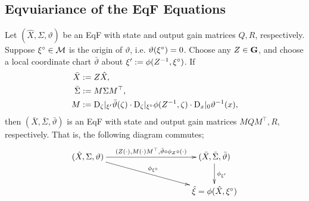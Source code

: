 \documentclass{article}
\begin{document}
\subsection{Eqvuiariance of the EqF Equations}

\begin{theorem} \label{theorem:origin_change}
Let $(\hat{X}, \Sigma, \vartheta)$ be an EqF with state and output gain matrices $Q,R$, respectively.
Suppose ${\xi}^\circ \in \mathcal{M}$ is the origin of $\vartheta$, i.e. $\vartheta({\xi}^\circ) = 0$.
Choose any $Z \in \mathbf{G}$, and choose a local coordinate chart $\bar{\vartheta}$ about $\xi' := \phi(Z^{-1}, {\xi}^\circ)$.
If 
\begin{align}
    \bar{X} &:= Z \hat{X}, \\
    \bar{\Sigma} &:= M \Sigma M^\top, \\
    M &:= \mathrm{D}_\zeta |_{\xi'} \bar{\vartheta}(\zeta) \cdot \mathrm{D}_\zeta |_{{\xi}^\circ} \phi(Z^{-1}, \zeta) \cdot \mathrm{D}_x|_0 \vartheta^{-1}(x),
\end{align}
then $(\bar{X}, \bar{\Sigma}, \bar{\vartheta})$ is an EqF with state and output gain matrices $M Q M^\top, R$, respectively.
That is, the following diagram commutes;
\[
\xymatrixcolsep{100pt}\xymatrix{
(\hat{X}, \Sigma, \vartheta)
\ar[r]^{(Z(\cdot), M(\cdot)M^\top, \bar{\vartheta} \circ \phi_Z \circ(\cdot)}
\ar[rd]^{\phi_{\mr{\xi}}}
&
(\bar{X}, \bar{\Sigma}, \bar{\vartheta})
\ar[d]^{\phi_{\xi'}}
\\
&
\hat{\xi} = \phi(\hat{X}, \mr{\xi})
}
\]
\end{theorem}
\end{document}
